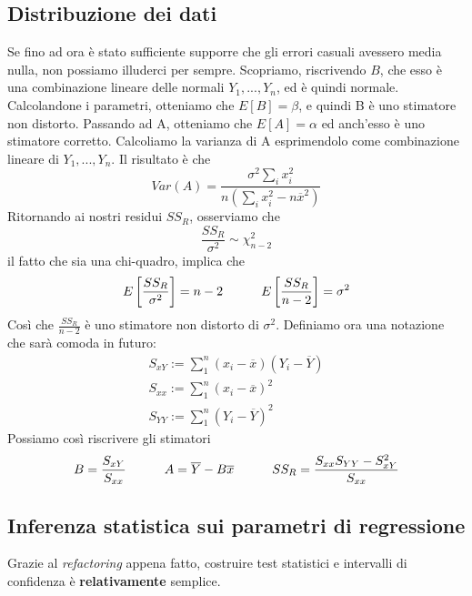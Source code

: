 \documentclass[11pt]{article}
\begin{document}
\subsection{Distribuzione dei dati}
Se fino ad ora è stato sufficiente supporre che gli errori casuali avessero media nulla, non possiamo illuderci per sempre. Scopriamo, riscrivendo $B$, che esso è una combinazione lineare delle normali $Y_1,...,Y_n$, ed è quindi normale. Calcolandone i parametri, otteniamo che $E[B] = \beta$, e quindi B è uno stimatore non distorto. Passando ad A, otteniamo che $E[A]=\alpha$ ed anch'esso è uno stimatore corretto. Calcoliamo la varianza di A esprimendolo come combinazione lineare di $Y_1,...,Y_n$. Il risultato è che
\begin{displaymath}
    Var(A)=\frac{\sigma^2\sum_i x_i^2}{n\left(\sum_i x_i^2-n\overline{x}^2\right)}
\end{displaymath}
Ritornando ai nostri residui $SS_R$, osserviamo che 
\begin{displaymath}
    \frac{SS_R}{\sigma^2} \sim \chi^2_{n-2}
\end{displaymath}
il fatto che sia una chi-quadro, implica che
\begin{displaymath}
    E\left[\frac{SS_R}{\sigma^2}\right] = n-2 \hspace{30px}E\left[\frac{SS_R}{n-2}\right] = \sigma^2
\end{displaymath}
Così che $\frac{SS_R}{n-2}$ è uno stimatore non distorto di $\sigma^2$. 
Definiamo ora una notazione che sarà comoda in futuro:
\begin{gather*}
    S_{xY} := \sum_1^n(x_i-\overline{x})(Y_i-\overline{Y})\\ 
    S_{xx} := \sum_1^n (x_i-\overline{x})^2\\ 
    S_{YY} := \sum_1^n (Y_i-\overline{Y})^2
\end{gather*}
Possiamo così riscrivere gli stimatori
\begin{displaymath}
    B = \frac{S_{xY}}{S_{xx}}\hspace{30px}A = \overline{Y}-B\overline{x}\hspace{30px}SS_R=\frac{S_{xx}S_{YY}-S^2_{xY}}{S_{xx}}
\end{displaymath}
\subsection{Inferenza statistica sui parametri di regressione}
Grazie al \textit{refactoring} appena fatto, costruire test statistici e intervalli di confidenza è \textbf{relativamente} semplice.
\end{document}
